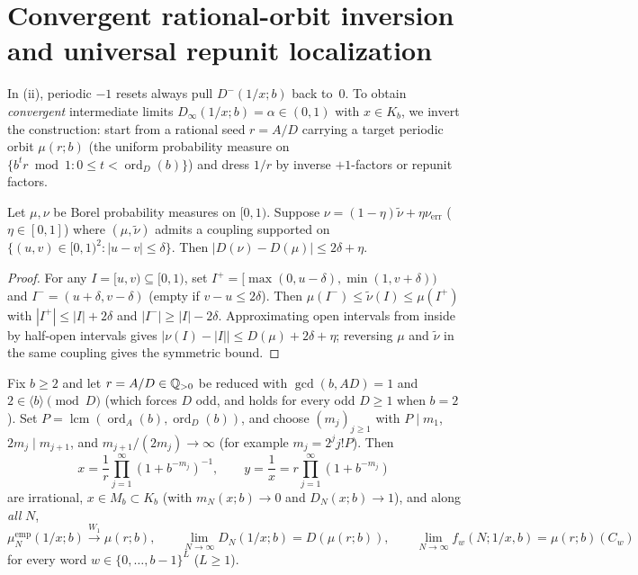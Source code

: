 \documentclass[11pt]{article}
\DeclareMathOperator{\ord}{ord}
\DeclareMathOperator{\lcm}{lcm}
\begin{document}
\section{Convergent rational-orbit inversion and universal repunit localization}\label{sec:convergent}

In (ii), periodic $-1$ resets always pull $D^-(1/x;b)$ back to~$0$. To obtain \emph{convergent} intermediate limits $D_\infty(1/x;b)=\alpha\in(0,1)$ with $x\in K_b$, we invert the construction: start from a rational seed $r=A/D$ carrying a target periodic orbit $\mu(r;b)$ (the uniform probability measure on $\{b^t r\bmod1:0\le t<\ord_D(b)\}$) and dress $1/r$ by inverse $+1$-factors or repunit factors.

\begin{lemma}\label{lem:Winf-stability}
Let $\mu,\nu$ be Borel probability measures on $[0,1)$. Suppose $\nu=(1-\eta)\tilde\nu+\eta\nu_{\mathrm{err}}$ ($\eta\in[0,1]$) where $(\mu,\tilde\nu)$ admits a coupling supported on $\{(u,v)\in[0,1)^2:|u-v|\le\delta\}$. Then $|D(\nu)-D(\mu)|\le 2\delta+\eta$.
\end{lemma}

\begin{proof}
For any $I=[u,v)\subseteq[0,1)$, set $I^+=[\max(0,u-\delta),\min(1,v+\delta))$ and $I^-=(u+\delta,v-\delta)$ (empty if $v-u\le 2\delta$). Then $\mu(I^-)\le\tilde\nu(I)\le\mu(I^+)$ with $|I^+|\le|I|+2\delta$ and $|I^-|\ge|I|-2\delta$. Approximating open intervals from inside by half-open intervals gives $|\nu(I)-|I||\le D(\mu)+2\delta+\eta$; reversing $\mu$ and $\tilde\nu$ in the same coupling gives the symmetric bound.
\end{proof}

\begin{theorem}\label{thm:plus1-inversion}
Fix $b\ge2$ and let $r=A/D\in\mathbb Q_{>0}$ be reduced with $\gcd(b,AD)=1$ and $2\in\langle b\rangle\pmod D$ (which forces $D$ odd, and holds for every odd $D\ge1$ when $b=2$). Set $P=\lcm(\ord_A(b),\ord_D(b))$, and choose $(m_j)_{j\ge1}$ with $P\mid m_1$, $2m_j\mid m_{j+1}$, and $m_{j+1}/(2m_j)\to\infty$ (for example $m_j=2^j j! P$). Then
\[
x=\frac1r\prod_{j=1}^\infty(1+b^{-m_j})^{-1},\qquad y=\frac1x=r\prod_{j=1}^\infty(1+b^{-m_j})
\]
are irrational, $x\in M_b\subset K_b$ (with $m_N(x;b)\to0$ and $D_N(x;b)\to1$), and along \emph{all} $N$,
\[
\mu_N^{\mathrm{emp}}(1/x;b)\xrightarrow{W_1}\mu(r;b),\qquad \lim_{N\to\infty}D_N(1/x;b)=D(\mu(r;b)),\qquad \lim_{N\to\infty}f_w(N;1/x,b)=\mu(r;b)(C_w)
\]
for every word $w\in\{0,\dots,b-1\}^L$ ($L\ge1$).
\end{theorem}
\end{document}
